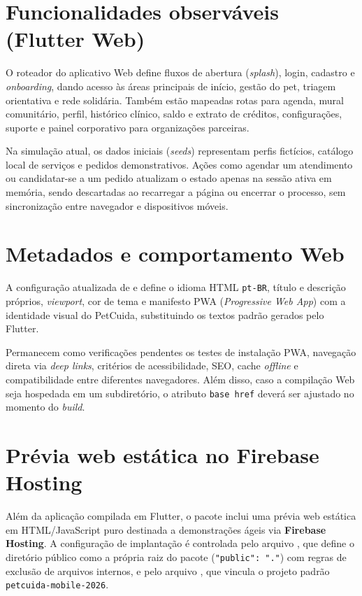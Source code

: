 \documentclass[12pt,a4paper]{article}
\begin{document}
\section{Funcionalidades observáveis (Flutter Web)}
O roteador do aplicativo Web define fluxos de abertura (\textit{splash}), login, cadastro e \textit{onboarding}, dando acesso às áreas principais de início, gestão do pet, triagem orientativa e rede solidária. Também estão mapeadas rotas para agenda, mural comunitário, perfil, histórico clínico, saldo e extrato de créditos, configurações, suporte e painel corporativo para organizações parceiras.

Na simulação atual, os dados iniciais (\textit{seeds}) representam perfis fictícios, catálogo local de serviços e pedidos demonstrativos. Ações como agendar um atendimento ou candidatar-se a um pedido atualizam o estado apenas na sessão ativa em memória, sendo descartadas ao recarregar a página ou encerrar o processo, sem sincronização entre navegador e dispositivos móveis.

\section{Metadados e comportamento Web}
A configuração atualizada de  e  define o idioma HTML \texttt{pt-BR}, título e descrição próprios, \textit{viewport}, cor de tema e manifesto PWA (\textit{Progressive Web App}) com a identidade visual do PetCuida, substituindo os textos padrão gerados pelo Flutter.

Permanecem como verificações pendentes os testes de instalação PWA, navegação direta via \textit{deep links}, critérios de acessibilidade, SEO, cache \textit{offline} e compatibilidade entre diferentes navegadores. Além disso, caso a compilação Web seja hospedada em um subdiretório, o atributo \texttt{base href} deverá ser ajustado no momento do \textit{build}.

\section{Prévia web estática no Firebase Hosting}
Além da aplicação compilada em Flutter, o pacote inclui uma prévia web estática em HTML/JavaScript puro destinada a demonstrações ágeis via \textbf{Firebase Hosting}. A configuração de implantação é controlada pelo arquivo , que define o diretório público como a própria raiz do pacote (\texttt{"public": "."}) com regras de exclusão de arquivos internos, e pelo arquivo , que vincula o projeto padrão \texttt{petcuida-mobile-2026}.
\end{document}
